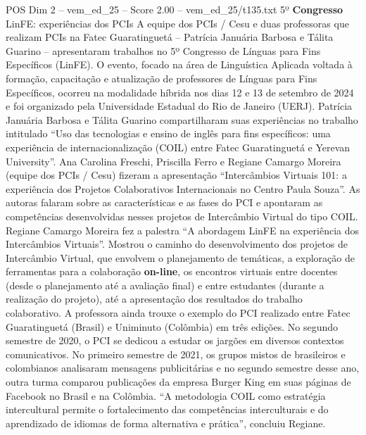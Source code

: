 \begin{textsample}{POS Dim 2 – vem\_ed\_25 – Score 2.00 – vem\_ed\_25/t135.txt}  \label{ex:f2_pos_138}
5º \textbf{Congresso} LinFE: experiências dos PCIs A equipe dos PCIs / Cesu e duas professoras que realizam PCIs na Fatec Guaratinguetá – Patrícia Januária Barbosa e Tálita Guarino – apresentaram trabalhos no 5º Congresso de Línguas para Fins Específicos (LinFE).
O evento, focado na área de Linguística Aplicada voltada à formação, capacitação e atualização de professores de Línguas para Fins Específicos, ocorreu na modalidade híbrida nos dias 12 e 13 de setembro de 2024 e foi organizado pela Universidade Estadual do Rio de Janeiro (UERJ).
Patrícia Januária Barbosa e Tálita Guarino compartilharam suas experiências no trabalho intitulado “Uso das tecnologias e ensino de inglês para fins específicos: uma experiência de internacionalização (COIL) entre Fatec Guaratinguetá e Yerevan University”.
Ana Carolina Freschi, Priscilla Ferro e Regiane Camargo Moreira (equipe dos PCIs / Cesu) fizeram a apresentação “Intercâmbios Virtuais 101: a experiência dos Projetos Colaborativos Internacionais no Centro Paula Souza”.
As autoras falaram sobre as características e as fases do PCI e apontaram as competências desenvolvidas nesses projetos de Intercâmbio Virtual do tipo COIL.
Regiane Camargo Moreira fez a palestra “A abordagem LinFE na experiência dos Intercâmbios Virtuais”.
Mostrou o caminho do desenvolvimento dos projetos de Intercâmbio Virtual, que envolvem o planejamento de temáticas, a exploração de ferramentas para a colaboração \textbf{on-line}, os encontros virtuais entre docentes (desde o planejamento até a avaliação final) e entre estudantes (durante a realização do projeto), até a apresentação dos resultados do trabalho colaborativo.
A professora ainda trouxe o exemplo do PCI realizado entre Fatec Guaratinguetá (Brasil) e Uniminuto (Colômbia) em três edições.
No segundo semestre de 2020, o PCI se dedicou a estudar os jargões em diversos contextos comunicativos.
No primeiro semestre de 2021, os grupos mistos de brasileiros e colombianos analisaram mensagens publicitárias e no segundo semestre desse ano, outra turma comparou publicações da empresa Burger King em suas páginas de Facebook no Brasil e na Colômbia. “A metodologia COIL como estratégia intercultural permite o fortalecimento das competências interculturais e do aprendizado de idiomas de forma alternativa e prática”, concluiu Regiane.

\end{textsample}
